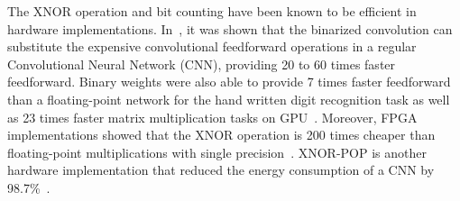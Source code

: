 The XNOR operation and bit counting have been known to be efficient in
hardware implementations. In~\cite{rastegari2016xnor}, it was shown
that the binarized convolution can substitute the expensive
convolutional feedforward operations in a regular Convolutional Neural
Network (CNN), %
providing 20 to 60 times faster feedforward. Binary weights were also
able to provide 7 times faster feedforward than a floating-point
network for the hand written digit recognition task as well as 23
times faster matrix multiplication tasks on
GPU~\cite{hubara2016binarized}.
Moreover, FPGA implementations showed that the XNOR operation is 200
times cheaper than floating-point multiplications with 
single precision~\cite{beauchamp2006embedded,govindu2004analysis}.
XNOR-POP is another hardware implementation that reduced
the energy consumption of a CNN by 98.7\%~\cite{jiang2017xnor}.

